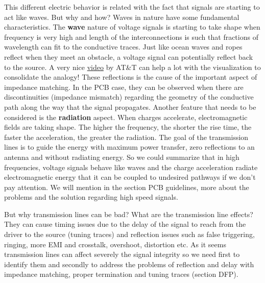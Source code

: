 \documentclass[final]{cubedoc}
\begin{document}
	This different electric behavior is related with the fact that signals are starting to act like waves. But why and how?
	Waves in nature have some fundamental characteristics. The \textbf{wave} nature of voltage signals is starting to take shape when frequency is very high and length of the interconnections is such that fractions of wavelength can fit to the conductive traces. Just like ocean waves and ropes reflect when they meet an obstacle, a voltage signal can potentially reflect back to the source. A very nice \href{https://www.youtube.com/watch?v=DovunOxlY1k}{video} by AT\&T can help a lot with the visualization to consolidate the analogy! These reflections is the cause of the important aspect of impedance matching. In the PCB case, they can be observed when there are discontinuities (impedance mismatch) regarding the geometry of the conductive path along the way that the signal propagates. Another feature that needs to be considered is the \textbf{radiation} aspect. When charges accelerate, electromagnetic fields are taking shape. The higher the frequency, the shorter the rise time, the faster the acceleration, the greater the radiation. The goal of the transmission lines is to guide the energy with maximum power transfer, zero reflections to an antenna and without radiating energy. So we could summarize that in high frequencies, voltage signals behave like waves and the charge acceleration radiate electromagnetic energy that it can be coupled to undesired pathways if we don't pay attention. We will mention in the section PCB guidelines, more about the problems and the solution regarding high speed signals.
	
	But why transmission lines can be bad? What are the transmission line effects? They can cause timing issues due to the delay of the signal to reach from the driver to the source (tuning traces) and reflection issues such as false triggering, ringing, more EMI and crosstalk, overshoot, distortion etc. As it seems transmission lines can affect severely the signal integrity so we need first to identify them and secondly to address the problems of reflection and delay with impedance matching, proper termination and tuning traces (section DFP).
	
	
\end{document}
